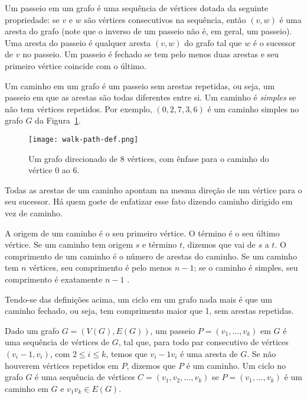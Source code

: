 Um passeio em um grafo é uma sequência de vértices dotada da seguinte propriedade: se $v$ e $w$ são vértices consecutivos na sequência, então $(v, w)$ é uma aresta do grafo (note que o inverso de um passeio não é, em geral, um passeio). Uma aresta do passeio é qualquer aresta $(v, w)$ do grafo tal que $w$ é o sucessor de $v$ no passeio. Um passeio é fechado se tem pelo menos duas arestas e seu primeiro vértice coincide com o último.

Um caminho em um grafo é um passeio sem arestas repetidas, ou seja, um passeio em que as arestas são todas diferentes entre si. Um caminho é \emph{simples} se não tem vértices repetidos. Por exemplo, $(0, 2, 7, 3, 6)$ é um caminho simples no grafo $G$ da Figura~\ref{sec2:walk-path-def}.

\begin{figure}
    \centering
    \texttt{[image: walk-path-def.png]}
    \caption{Um grafo direcionado de 8 vértices, com ênfase para o caminho do vértice 0 ao 6.}
    \label{sec2:walk-path-def}
\end{figure}

Todas as arestas de um caminho apontam na mesma direção de um vértice para o seu sucessor. Há quem goste de enfatizar esse fato dizendo caminho dirigido em vez de caminho.

A origem de um caminho é o seu primeiro vértice. O término é o seu último vértice. Se um caminho tem origem $s$ e término $t$, dizemos que vai de $s$ a $t$. O comprimento de um caminho é o número de arestas do caminho. Se um caminho tem $n$ vértices, seu comprimento é pelo menos \begin{math}n - 1\end{math}; se o caminho é simples, seu comprimento é exatamente \begin{math}n - 1\end{math} \cite{feofiloff2018}.

Tendo-se das definições acima, um ciclo em um grafo nada mais é que um caminho fechado, ou seja, tem comprimento maior que 1, sem arestas repetidas.

\begin{definition}
    Dado um grafo $G = (V(G), E(G))$, um passeio $P = (v_1, ..., v_k)$ em $G$ é uma sequência de vértices de $G$, tal que, para todo par consecutivo de vértices $(v_i - 1, v_i)$, com $2 \leq i \leq k$, temos que $v_i - 1v_i$ é uma aresta de $G$. Se não houverem vértices repetidos em $P$, dizemos que $P$  é um caminho. Um ciclo no grafo $G$ é uma sequência de vértices $C = (v_1,v_2,...,v_k)$ se $P = (v_1, ..., v_k)$ é um caminho em $G$ e $v_1v_k \in E(G)$.
\end{definition}

